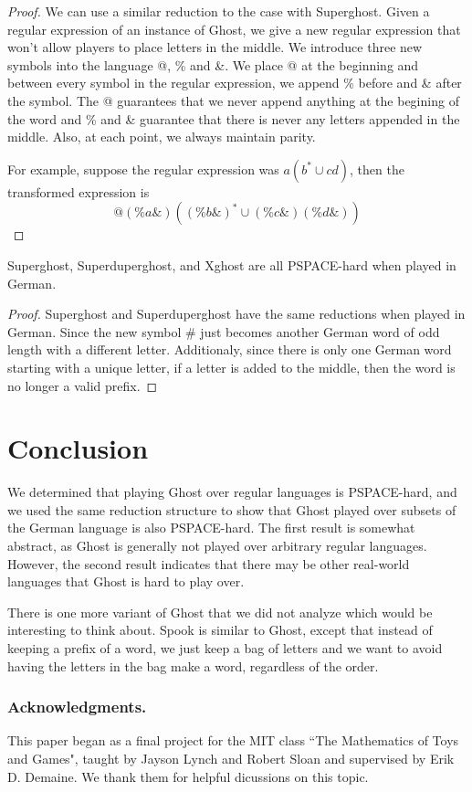 \documentclass[runningheads,a4paper]{llncs}
\begin{document}
\begin{proof}
We can use a similar reduction to the case with Superghost. Given a regular expression of an instance of Ghost, we give a new regular expression that won't allow players to place letters in the middle. We introduce three new symbols into the language @, \% and \&. We place @ at the beginning and between every symbol in the regular expression, we append \% before and \& after the symbol. The @ guarantees that we never append anything at the begining of the word and \% and \& guarantee that there is never any letters appended in the middle. Also, at each point, we always maintain parity.

For example, suppose the regular expression was $a(b^* \cup cd)$, then the transformed expression is
\[ @(\%a\&)((\%b\&)^* \cup (\%c\&)(\%d\&)) \]
\end{proof}

\begin{corollary}
Superghost, Superduperghost, and Xghost are all PSPACE-hard when played in German.
\end{corollary}

\begin{proof}
Superghost and Superduperghost have the same reductions when played in German. Since the new symbol \# just becomes another German word of odd length with a different letter. Additionaly, since there is only one German word starting with a unique letter, if a letter is added to the middle, then the word is no longer a valid prefix. 
\end{proof}

\section{Conclusion}
\label{Conclusion}

We determined that playing Ghost over regular languages is PSPACE-hard, and we used the same reduction structure to show that Ghost played over subsets of the German language is also PSPACE-hard. The first result is somewhat abstract, as Ghost is generally not played over arbitrary regular languages. However, the second result indicates that there may be other real-world languages that Ghost is hard to play over.

There is one more variant of Ghost that we did not analyze which would be interesting to think about. Spook is similar to Ghost, except that instead of keeping a prefix of a word, we just keep a bag of letters and we want to avoid having the letters in the bag make a word, regardless of the order.

\subsubsection*{Acknowledgments.} This paper began as a final project for the MIT class ``The Mathematics of Toys and Games", taught by Jayson Lynch and Robert Sloan and supervised by Erik D. Demaine. We thank them for helpful dicussions on this topic.



\end{document}
